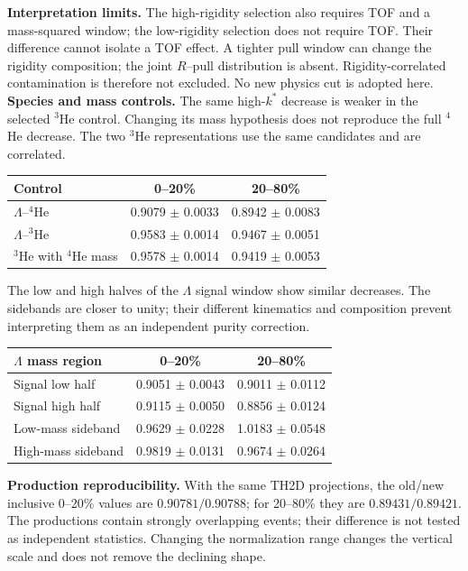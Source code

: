\documentclass[10pt,a4paper]{article}
\begin{document}
\textbf{Interpretation limits.} The high-rigidity selection also requires TOF and a mass-squared window;
the low-rigidity selection does not require TOF. Their difference cannot isolate a TOF effect.
A tighter pull window can change the rigidity composition; the joint $R$--pull distribution is absent.
Rigidity-correlated contamination is therefore not excluded. No new physics cut is adopted here.
\newpage
\textbf{Species and mass controls.} The same high-$k^*$ decrease is weaker in the selected $^3$He control.
Changing its mass hypothesis does not reproduce the full $^4$He decrease.
The two $^3$He representations use the same candidates and are correlated.
\begin{center}\begin{tabular}{lcc}\toprule
Control & 0--20\% & 20--80\%\\\midrule
$\Lambda$--$^4$He & 0.9079 $\pm$ 0.0033 & 0.8942 $\pm$ 0.0083 \\
$\Lambda$--$^3$He & 0.9583 $\pm$ 0.0014 & 0.9467 $\pm$ 0.0051 \\
$^3$He with $^4$He mass & 0.9578 $\pm$ 0.0014 & 0.9419 $\pm$ 0.0053 \\
\bottomrule\end{tabular}\end{center}
The low and high halves of the $\Lambda$ signal window show similar decreases.
The sidebands are closer to unity; their different kinematics and composition prevent interpreting them as an independent purity correction.
\begin{center}\begin{tabular}{lcc}\toprule
$\Lambda$ mass region & 0--20\% & 20--80\%\\\midrule
Signal low half & 0.9051 $\pm$ 0.0043 & 0.9011 $\pm$ 0.0112 \\
Signal high half & 0.9115 $\pm$ 0.0050 & 0.8856 $\pm$ 0.0124 \\
Low-mass sideband & 0.9629 $\pm$ 0.0228 & 1.0183 $\pm$ 0.0548 \\
High-mass sideband & 0.9819 $\pm$ 0.0131 & 0.9674 $\pm$ 0.0264 \\
\bottomrule\end{tabular}\end{center}
\textbf{Production reproducibility.} With the same TH2D projections, the old/new inclusive 0--20\% values are
$0.90781/0.90788$; for 20--80\% they are $0.89431/0.89421$.
The productions contain strongly overlapping events; their difference is not tested as independent statistics.
Changing the normalization range changes the vertical scale and does not remove the declining shape.
\end{document}
